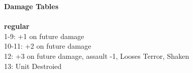 {\bf Damage Tables} \\
\ \\ {\bf regular } \\
1-9: +1 on future damage \\
10-11: +2 on future damage \\
12: +3 on future damage, assault -1, Looses Terror, Shaken \\
13: Unit Destroied \\










